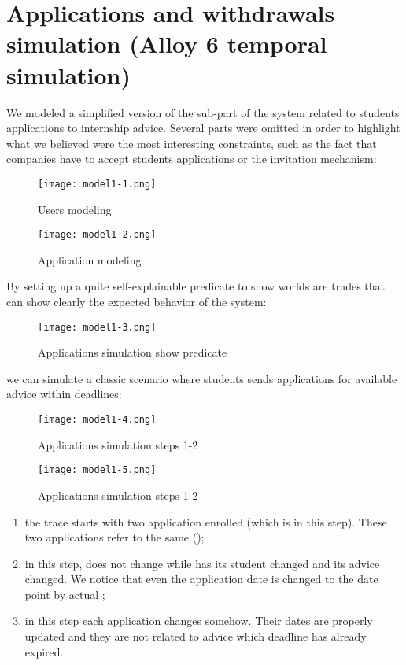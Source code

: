 	\section{Applications and withdrawals simulation (Alloy 6 temporal simulation)}
		We modeled a simplified version of the sub-part of the system related to students applications to internship advice. Several parts were omitted in order to highlight what we believed were the most interesting constraints, such as the fact that companies have to accept students applications or the invitation mechanism:
			\begin{figure}
				\texttt{[image: model1-1.png]}
				\caption{Users modeling}
			\end{figure}
		\begin{figure}[H]
			\centering
			\texttt{[image: model1-2.png]}
			\caption{Application modeling}
		\end{figure}
		By setting up a quite self-explainable predicate to show worlds are trades that can show clearly the expected behavior of the system:
		\begin{figure}[H]
			\centering
			\texttt{[image: model1-3.png]}
			\caption{Applications simulation show predicate}
		\end{figure}
		we can simulate a classic scenario where students sends applications for available advice within deadlines:
		\begin{figure}[H]
			\centering
			\texttt{[image: model1-4.png]}
			\caption{Applications simulation steps 1-2}
		\end{figure}
		\begin{figure}[H]
			\centering
			\texttt{[image: model1-5.png]}
			\caption{Applications simulation steps 1-2}
		\end{figure}
		\begin{enumerate}[start=0]
			\item the trace starts with two application enrolled  (which is  in this step). These two applications refer to the same  ();
			\item in this step,  does not change while  has its student changed and its advice changed. We notice that even the application date is changed to the date point by actual ;
			\item in this step each application changes somehow. Their dates are properly updated and they are not related to advice which deadline has already expired.
		\end{enumerate}
		
